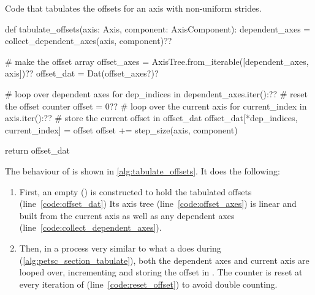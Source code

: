 \documentclass[thesis]{subfiles}
\begin{document}
\begin{algorithm}
  \caption{
    Code that tabulates the offsets for an axis with non-uniform strides.
  }

  \begin{center}
    \begin{minipage}{.9\textwidth}
      \begin{pyalg2}
        def tabulate_offsets(axis: Axis, component: AxisComponent):
          dependent_axes = collect_dependent_axes(axis, component)?\label{code:collect_dependent_axes}?

          # make the offset array
          offset_axes = AxisTree.from_iterable([dependent_axes, axis])?\label{code:offset_axes}?
          offset_dat = Dat(offset_axes?\label{code:offset_dat})?

          # loop over dependent axes
          for dep_indices in dependent_axes.iter():?\label{code:loop_dependent_axes}?
            # reset the offset counter
            offset = 0?\label{code:reset_offset}?
            # loop over the current axis
            for current_index in axis.iter():?\label{code:loop_current_axis}?
              # store the current offset in offset_dat
              offset_dat[*dep_indices, current_index] = offset
              offset += step_size(axis, component)

          return offset_dat
      \end{pyalg2}
    \end{minipage}
  \end{center}
  \label{alg:tabulate_offsets}
\end{algorithm}

The behaviour of  is shown in \cref{alg:tabulate_offsets}.
It does the following:

\begin{enumerate}
  \item
    First, an empty  () is constructed to hold the tabulated offsets (line~\ref{code:offset_dat})
    Its axis tree (line~\ref{code:offset_axes}) is linear and built from the current axis as well as any dependent axes (line~\ref{code:collect_dependent_axes}).

  \item
    Then, in a process very similar to what a  does during  (\cref{alg:petsc_section_tabulate}), both the dependent axes and current axis are looped over, incrementing and storing the offset in .
    The  counter is reset at every iteration of  (line~\ref{code:reset_offset}) to avoid double counting.
\end{enumerate}
\end{document}
